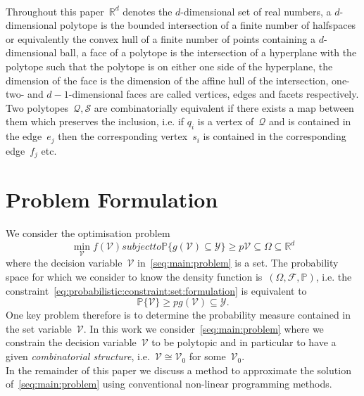 \documentclass[letterpaper, 10pt, conference]{ieeeconf} %
\begin{document}
%
\\[1em]
%
Throughout this paper~$\mathbb R^d$ denotes the $d$-dimensional set of real numbers, a $d$-dimensional polytope is the bounded intersection of a finite number of halfspaces or equivalently the convex hull of a finite number of points containing a $d$-dimensional ball, a face of a polytope is the intersection of a hyperplane with the polytope such that the polytope is on either one side of the hyperplane, the dimension of the face is the dimension of the affine hull of the intersection, one- two- and $d-1$-dimensional faces are called vertices, edges and facets respectively. 
%
Two polytopes~$\mathcal Q,\mathcal S$ are combinatorially equivalent if there exists a map between them which preserves the inclusion, i.e. if $q_i$ is a vertex of~$\mathcal Q$ and is contained in the edge~$e_j$ then the corresponding vertex~$s_i$ is contained in the corresponding edge~$f_j$ etc.
%
\section{Problem Formulation}\label{sec:problem:formulation}
%
%
%
\noindent We consider the optimisation problem
%
\begin{subequations}\label{seq:main:problem}
\begin{equation}
\min_{\mathcal V} f(\mathcal V)
\end{equation}
subject to
\begin{equation}\label{eq:probabilistic:constraint:set:formulation}
	\mathbb P\{g(\mathcal V)\subseteq\mathcal Y\}\geq p
\end{equation}
%
\begin{equation}
	\mathcal V\subseteq\Omega\subseteq \mathbb R^d
\end{equation}
\end{subequations}
%
where the decision variable~$\mathcal V$ in~\eqref{seq:main:problem} is a set.
%
The probability space for which we consider to know the density function is~$(\Omega,\mathscr F,\mathbb P)$, i.e. the constraint~\eqref{eq:probabilistic:constraint:set:formulation} is equivalent to
%
\begin{subequations}
\begin{equation}
	\mathbb P\{\mathcal V\}\geq p
\end{equation}
%
\begin{equation}
	g(\mathcal V)\subseteq\mathcal Y.
\end{equation}
\end{subequations}
%
One key problem therefore is to determine the probability measure contained in the set variable~$\mathcal V$.
%
In this work we consider~\eqref{seq:main:problem} where we constrain the decision variable~$\mathcal V$ to be polytopic and in particular to have a given \emph{combinatorial structure}, i.e.~$\mathcal V\cong\mathcal V_0$ for some~$\mathcal V_0$.
%
\\[1em]
%
In the remainder of this paper we discuss a method to approximate the solution of~\eqref{seq:main:problem} using conventional non-linear programming methods.
\end{document}
